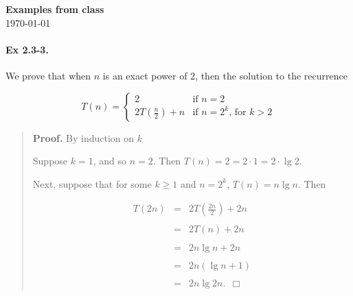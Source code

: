 \documentclass{article}
\begin{document}

\begin{center}
\textbf{Examples from class} \\
\today
\end{center}


\paragraph{Ex 2.3-3.}
We prove that when $n$   %
is an exact power of 2, then the
solution to the recurrence


\[
T(n) = 
\left\{     %
\begin{array}{ll}      %
2 & \mbox{if $n=2$} \\      %
2 T(\frac{n}{2}) + n & \mbox{if $n = 2^k$, for $k > 2$}
\end{array}
\right.      %
\]


\begin{quote}
\textbf{Proof.}  %
By induction on $k$

Suppose $k = 1$, and so $n = 2$. 
Then $T(n) = 2 = 2 \cdot 1 = 2 \cdot \lg 2$.

Next, suppose that for some $k \geq 1$  and $n = 2^k$, 
$T(n) = n \lg n$.
Then 

\[
\begin{array}{rcl}
T(2n) &=& 2 T(\frac{2n}{2}) + 2n \\ \\
&=& 2 T(n) + 2n \\ \\
&=& 2 n \lg n + 2n \\ \\
&=& 2 n (\lg n + 1) \\ \\
&=& 2 n \lg 2n. \ \  \Box     %
\end{array}
\]
\end{quote}
\end{document}

